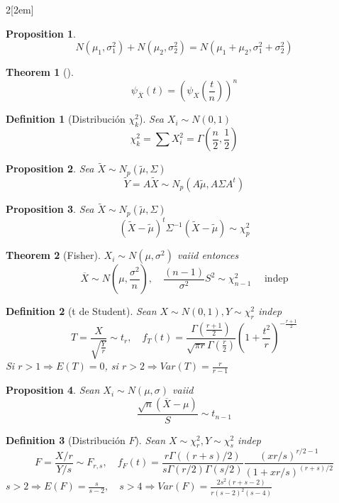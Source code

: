 \documentclass[leqno]{article}
\newtheorem*{theorem}{Theorem}
\newtheorem*{proposition}{Proposition}
\newtheorem*{definition}{Definition}
\begin{document}
\begin{multicols}{2}[\columnsep2em]
\begin{proposition}
\[
N(\mu_1, \sigma_1^2) + N(\mu_2, \sigma _2^2) = N(\mu_1+\mu_2, \sigma_1^2+\sigma _2^2)
\]  
\end{proposition}

\begin{theorem}[]
\[
  \psi _{\overline{X}}(t) = (\psi_X \left( \frac{t}{n} \right) )^n
\] 
\end{theorem}

\begin{definition}[Distribución $\chi_k^2$] Sea $X_i \sim N(0,1)$
\[
\chi_k^2 = \sum X_i^2 = \Gamma\left(\frac{n}{2}, \frac{1}{2}\right)
\] 
\end{definition}

\begin{proposition} Sea $\tilde{X} \sim N_p(\tilde{\mu}, \Sigma)$ 
  \[
  \tilde{Y} = A\tilde{X} \sim N_p(A\tilde{\mu}, A\Sigma A^t)
  \] 
\end{proposition}

\begin{proposition}Sea $\tilde{X}\sim N_p(\tilde{\mu}, \Sigma)$ 
  \[
	(\tilde{X}-\tilde{\mu})^t\Sigma^{-1}(\tilde{X}-\tilde{\mu})\sim \chi^2_{p}
  \] 
\end{proposition}

\begin{theorem}[Fisher] $X_i \sim  N(\mu, \sigma ^2)$ vaiid entonces
\[
\overline{X} \sim N\left(\mu,\frac{\sigma ^2}{n}\right), \quad \frac{(n-1)}{\sigma ^2}S^2 \sim \chi _{n-1}^2 \quad \text{ indep}
\] 
\end{theorem}

\begin{definition}[t de Student] Sean $X \sim N(0,1), Y\sim \chi _r^2$ indep
\[
T = \frac{X}{\sqrt{\frac{Y}{r}}} \sim t_r, \quad f_T(t) = \frac{\Gamma (\frac{r+1}{2})}{\sqrt{\pi r}\Gamma \left( \frac{r}{2} \right)  } \left( 1+ \frac{t^2}{r} \right)^{-\frac{r+1}{2}}
\] 
Si  $r>1 \Rightarrow E(T)=0$, si $r>2  \Rightarrow Var(T) = \frac{r}{r-1}$
\end{definition}

\begin{proposition}Sean $X_i \sim N(\mu, \sigma )$ vaiid
  \[
  \frac{\sqrt{n} (\overline{X}-\mu)}{S} \sim t_{n-1}
  \] 
\end{proposition}


\begin{definition}[Distribución $F$] Sean $X \sim \chi_r^2, Y\sim \chi _s^2$ indep
\[
F = \frac{X/r}{Y/s} \sim F_{r,s}, \quad f_F(t) = \frac{r\Gamma((r+s)/2)}{s\Gamma(r/2)\Gamma(s/2)} \frac{(xr/s)^{r/2-1}}{(1+xr/s)^{(r+s)/2}}
\] 
$s>2 \Rightarrow E(F)=\frac{s}{s-2}, \quad s>4  \Rightarrow Var(F) = \frac{2s^2(r+s-2)}{r(s-2)^2(s-4)}$
\end{definition}


\end{multicols}
\end{document}
